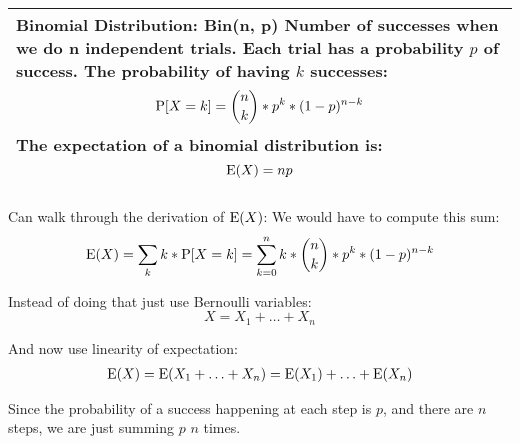 {\tabulinesep=1mm
\begin{tabu}{|p{16cm} |}
\hline
\vspace{2 mm}
\textbf{Binomial Distribution: Bin(n, p)}
Number of successes when we do n independent trials. Each trial has a 
probability $p$ of success. The probability of having $k$ successes:
\[ \P[X = k] = {n \choose k} * p^k * (1 - p)^{n - k}  \]
The expectation of a binomial distribution is:
\[ \E(X) = np \]
\vspace{5 mm}
\\
\hline
\end{tabu}
}

\begin{solution} %
Can walk through the derivation of $\E(X)$: 
We would have to compute this sum:
\[\E(X) = \sum_{k} k * \P[X = k] = \sum_{k = 0}^{n} k * {n \choose k} * 
p^k * (1 - p)^{n - k} \]

Instead of doing that just use Bernoulli variables:
\[ X = X_1 + \dotsc + X_n \]

And now use linearity of expectation:
\begin{equation}
\begin{split}
\E(X) = \E(X_1 + \dotsc + X_n) = \E(X_1) + \dotsc + \E(X_n) \nonumber
\end{split}
\end{equation}

Since the probability of a success happening at each step is $p$, and 
there are $n$ steps, we are just summing $p$  $n$ times.
\end{solution}